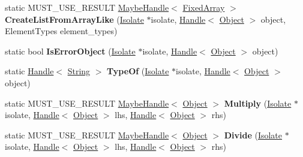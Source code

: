 \begin{DoxyCompactItemize}
\item 
static M\+U\+S\+T\+\_\+\+U\+S\+E\+\_\+\+R\+E\+S\+U\+LT \hyperlink{classv8_1_1internal_1_1_maybe_handle}{Maybe\+Handle}$<$ \hyperlink{classv8_1_1internal_1_1_fixed_array}{Fixed\+Array} $>$ {\bfseries Create\+List\+From\+Array\+Like} (\hyperlink{classv8_1_1internal_1_1_isolate}{Isolate} $\ast$isolate, \hyperlink{classv8_1_1internal_1_1_handle}{Handle}$<$ \hyperlink{classv8_1_1internal_1_1_object}{Object} $>$ object, Element\+Types element\+\_\+types)\hypertarget{classv8_1_1internal_1_1_object_a5801600bdacd06963cf92d99834efe26}{}\label{classv8_1_1internal_1_1_object_a5801600bdacd06963cf92d99834efe26}

\item 
static bool {\bfseries Is\+Error\+Object} (\hyperlink{classv8_1_1internal_1_1_isolate}{Isolate} $\ast$isolate, \hyperlink{classv8_1_1internal_1_1_handle}{Handle}$<$ \hyperlink{classv8_1_1internal_1_1_object}{Object} $>$ object)\hypertarget{classv8_1_1internal_1_1_object_acdf8f77a80752522a49f958e949a90f2}{}\label{classv8_1_1internal_1_1_object_acdf8f77a80752522a49f958e949a90f2}

\item 
static \hyperlink{classv8_1_1internal_1_1_handle}{Handle}$<$ \hyperlink{classv8_1_1internal_1_1_string}{String} $>$ {\bfseries Type\+Of} (\hyperlink{classv8_1_1internal_1_1_isolate}{Isolate} $\ast$isolate, \hyperlink{classv8_1_1internal_1_1_handle}{Handle}$<$ \hyperlink{classv8_1_1internal_1_1_object}{Object} $>$ object)\hypertarget{classv8_1_1internal_1_1_object_a80249ff76418f39d8d5292216fb4f4b9}{}\label{classv8_1_1internal_1_1_object_a80249ff76418f39d8d5292216fb4f4b9}

\item 
static M\+U\+S\+T\+\_\+\+U\+S\+E\+\_\+\+R\+E\+S\+U\+LT \hyperlink{classv8_1_1internal_1_1_maybe_handle}{Maybe\+Handle}$<$ \hyperlink{classv8_1_1internal_1_1_object}{Object} $>$ {\bfseries Multiply} (\hyperlink{classv8_1_1internal_1_1_isolate}{Isolate} $\ast$isolate, \hyperlink{classv8_1_1internal_1_1_handle}{Handle}$<$ \hyperlink{classv8_1_1internal_1_1_object}{Object} $>$ lhs, \hyperlink{classv8_1_1internal_1_1_handle}{Handle}$<$ \hyperlink{classv8_1_1internal_1_1_object}{Object} $>$ rhs)\hypertarget{classv8_1_1internal_1_1_object_afde77f776ae383aa2b2bfb41c5c18521}{}\label{classv8_1_1internal_1_1_object_afde77f776ae383aa2b2bfb41c5c18521}

\item 
static M\+U\+S\+T\+\_\+\+U\+S\+E\+\_\+\+R\+E\+S\+U\+LT \hyperlink{classv8_1_1internal_1_1_maybe_handle}{Maybe\+Handle}$<$ \hyperlink{classv8_1_1internal_1_1_object}{Object} $>$ {\bfseries Divide} (\hyperlink{classv8_1_1internal_1_1_isolate}{Isolate} $\ast$isolate, \hyperlink{classv8_1_1internal_1_1_handle}{Handle}$<$ \hyperlink{classv8_1_1internal_1_1_object}{Object} $>$ lhs, \hyperlink{classv8_1_1internal_1_1_handle}{Handle}$<$ \hyperlink{classv8_1_1internal_1_1_object}{Object} $>$ rhs)\hypertarget{classv8_1_1internal_1_1_object_ab31d52ad9c3669e4152c05ae2e09370d}{}\label{classv8_1_1internal_1_1_object_ab31d52ad9c3669e4152c05ae2e09370d}


\end{DoxyCompactItemize}
